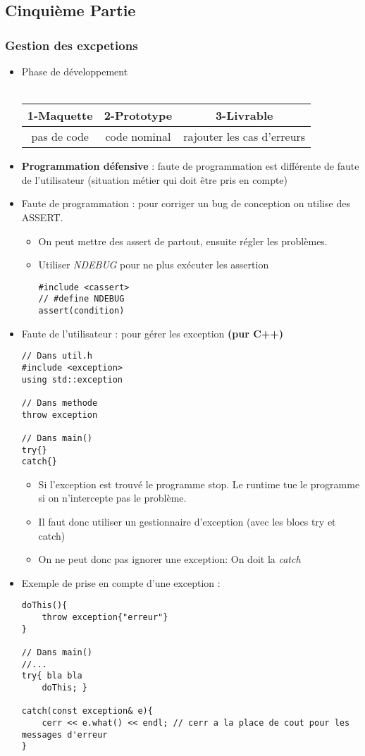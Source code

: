 \documentclass[12pt,a4paper]{article}
\begin{document}
\subsection{Cinquième Partie}
\subsubsection{Gestion des excpetions}
\begin{itemize}
\item Phase de développement \\\\
\begin{tabular}{|c|c|c|}
  \hline
  1-Maquette & 2-Prototype & 3-Livrable \\ \hline
  pas de code & code nominal & rajouter les cas d'erreurs\\ \hline
\end{tabular}
\item \textbf{Programmation défensive} : faute de programmation est différente de faute de l'utilisateur (situation métier qui doit être pris en compte)
\item Faute de programmation : pour corriger un bug de conception on utilise des ASSERT.
\begin{itemize}
\item On peut mettre des assert de partout, ensuite régler les problèmes.
\item Utiliser \textit{NDEBUG} pour ne plus exécuter les assertion
\begin{lstlisting}
#include <cassert>
// #define NDEBUG
assert(condition)
\end{lstlisting}
\end{itemize}
\item Faute de l'utilisateur : pour gérer les exception \textbf{(pur C++)}
\begin{lstlisting}
// Dans util.h
#include <exception>
using std::exception

// Dans methode
throw exception

// Dans main()
try{}
catch{}
\end{lstlisting}
\begin{itemize}
\item Si l'exception est trouvé le programme stop. Le runtime tue le programme si on n'intercepte pas le problème.
\item Il faut donc utiliser un gestionnaire d'exception (avec les blocs try et catch)
\item On ne peut donc pas ignorer une exception: On doit la  \textit{catch{}}
\end{itemize}
\item Exemple de prise en compte d'une exception :
\begin{lstlisting}
doThis(){
	throw exception{"erreur"}
}

// Dans main()
//...
try{ bla bla
	doThis; }

catch(const exception& e){
	cerr << e.what() << endl; // cerr a la place de cout pour les messages d'erreur
}
\end{lstlisting}
\end{itemize}
\end{document}
